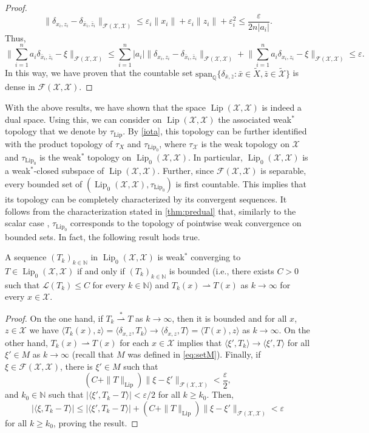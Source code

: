 \documentclass[onefignum,onetabnum]{siamonline250211}
\newcommand{\Lip}{\operatorname{Lip}}
\newcommand{\weakk}{\stackrel{\ast}{\rightharpoonup}}
\newcommand{\cX}{\mathcal{X}}
\begin{document}
\begin{proof}
$$
\|\delta_{x_i,z_i}-\delta_{\bar x_i,\bar z_i}\|_{\mathcal{F}(\cX,\cX)} \leq \varepsilon_i \|x_i\| + \varepsilon_i \|z_i\| + \varepsilon_i^2 \leq \frac{\varepsilon}{2n |a_i|}.
$$
Thus, \[\bigg\|\sum_{i=1}^n a_i\delta_{\bar x_i,\bar z_i}-\xi\bigg\|_{\mathcal{F}(\cX,\cX)}\leq \sum_{i=1}^n |a_i| \|\delta_{x_i,z_i}-\delta_{\bar x_i,\bar z_i}\|_{\mathcal{F}(\cX,\cX)} + \bigg\|\sum_{i=1}^n a_i\delta_{x_i,z_i}-\xi\bigg\|_{\mathcal{F}(\cX,\cX)}  \leq \varepsilon.\]
In this way, we have proven that the countable set $\text{span}_{\mathbb{Q}}\{\delta_{\bar x,\bar z} \colon \bar x \in \widetilde{X}, \bar z \in \widetilde{\cX}\}$ is dense in $\mathcal{F}(\cX, \cX)$.
\end{proof}
With the above results, we have shown that the space $\Lip(\cX, \cX)$ is indeed a dual space. Using this, we can consider on $\Lip(\cX, \cX)$ the associated weak$^*$ topology that we denote by $\tau_{\Lip}$. By \cref{iota}, this topology can be further identified with the product topology of $\tau_{X}$ and $\tau_{\Lip_0}$, where $\tau_{\cX}$ is the weak topology on $\cX$ and $\tau_{\Lip_0}$ is the weak$^*$ topology on $\Lip_0(\cX, \cX)$. In particular, $\Lip_0(\cX, \cX)$ is a weak$^*$-closed subspace of $\Lip(\cX, \cX)$. Further, since $\mathcal{F}(\cX, \cX)$ is separable, every bounded set of $(\Lip_0(\cX, \cX),\tau_{\Lip_0})$ is first countable. This implies that its topology can be completely characterized by its convergent sequences. It follows from the characterization stated in \cref{thm:predual} that, similarly to the scalar case \cite{Weaver}, $\tau_{\Lip_0}$ corresponds to the topology of pointwise weak convergence on bounded sets. In fact, the following result hods true.
\begin{lemma} A sequence $(T_k)_{k\in\mathbb{N}}$ in $\Lip_0(\cX, \cX)$ is weak$^*$ converging to $T\in\Lip_0(\cX, \cX)$ if and only if $(T_k)_{k\in\mathbb{N}}$ is bounded (i.e., there exists $C>0$ such that $\mathcal{L}(T_k)\leq C$ for every $k\in\mathbb{N}$) and $T_k(x)\rightharpoonup T(x)$ as $k\to\infty$ for every $x\in\cX$.
\end{lemma}
\begin{proof}
On the one hand, if $T_k\weakk T$ as $k\to\infty$, then it is bounded and for all $x$, $z\in \cX$ we have $\langle T_k(x), z\rangle = \langle\delta_{x, z}, T_k\rangle\to \langle \delta_{x, z}, T\rangle = \langle T(x), z\rangle$ as $k\to\infty$. On the other hand, $T_k(x) \rightharpoonup T(x)$ for each $x\in \cX$ implies that $\langle \xi', T_k\rangle \to \langle \xi', T\rangle$ for all $\xi'\in M$ as $k\to\infty$ (recall that $M$ was defined in \cref{eq:setM}). Finally, if $\xi\in\mathcal{F}(\cX, \cX)$, there is $\xi'\in M$ such that 
$$
(C + \|T\|_{\Lip})\|\xi-\xi'\|_{\mathcal{F}(\cX,\cX)}<\frac{\varepsilon}{2},
$$
and $k_0\in\mathbb{N}$ such that $|\langle \xi', T_k-T\rangle|<\varepsilon/2$ for all $k\geq k_0$. Then, 
$$
|\langle \xi, T_k-T\rangle|\leq |\langle \xi', T_k-T\rangle|+(C + \|T\|_{\Lip})\|\xi-\xi'\|_{\mathcal{F}(\cX,\cX)}<\varepsilon
$$ 
for all $k\geq k_0$, proving the result. 
\end{proof}
\end{document}
